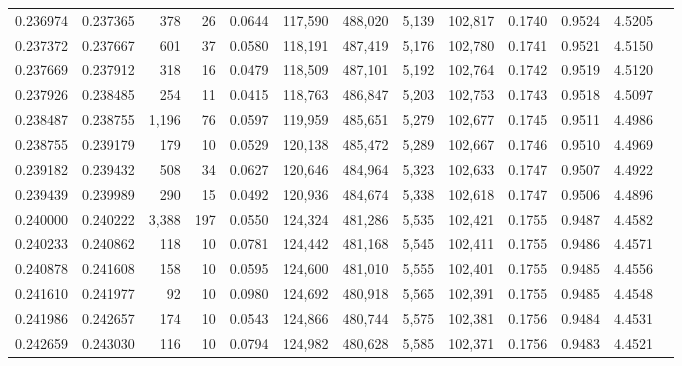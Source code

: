 \begin{tabular}{rrrrrrrrrrrrr}
0.236974 & 0.237365 &   378 &  26 &                                     0.0644 & 117,590 & 488,020 &   5,139 & 102,817 & 0.1740 & 0.9524 & 4.5205 \\
0.237372 & 0.237667 &   601 &  37 &                                     0.0580 & 118,191 & 487,419 &   5,176 & 102,780 & 0.1741 & 0.9521 & 4.5150 \\
0.237669 & 0.237912 &   318 &  16 &                                     0.0479 & 118,509 & 487,101 &   5,192 & 102,764 & 0.1742 & 0.9519 & 4.5120 \\
0.237926 & 0.238485 &   254 &  11 &                                     0.0415 & 118,763 & 486,847 &   5,203 & 102,753 & 0.1743 & 0.9518 & 4.5097 \\
0.238487 & 0.238755 & 1,196 &  76 &                                     0.0597 & 119,959 & 485,651 &   5,279 & 102,677 & 0.1745 & 0.9511 & 4.4986 \\
0.238755 & 0.239179 &   179 &  10 &                                     0.0529 & 120,138 & 485,472 &   5,289 & 102,667 & 0.1746 & 0.9510 & 4.4969 \\
0.239182 & 0.239432 &   508 &  34 &                                     0.0627 & 120,646 & 484,964 &   5,323 & 102,633 & 0.1747 & 0.9507 & 4.4922 \\
0.239439 & 0.239989 &   290 &  15 &                                     0.0492 & 120,936 & 484,674 &   5,338 & 102,618 & 0.1747 & 0.9506 & 4.4896 \\
0.240000 & 0.240222 & 3,388 & 197 &                                     0.0550 & 124,324 & 481,286 &   5,535 & 102,421 & 0.1755 & 0.9487 & 4.4582 \\
0.240233 & 0.240862 &   118 &  10 &                                     0.0781 & 124,442 & 481,168 &   5,545 & 102,411 & 0.1755 & 0.9486 & 4.4571 \\
0.240878 & 0.241608 &   158 &  10 &                                     0.0595 & 124,600 & 481,010 &   5,555 & 102,401 & 0.1755 & 0.9485 & 4.4556 \\
0.241610 & 0.241977 &    92 &  10 &                                     0.0980 & 124,692 & 480,918 &   5,565 & 102,391 & 0.1755 & 0.9485 & 4.4548 \\
0.241986 & 0.242657 &   174 &  10 &                                     0.0543 & 124,866 & 480,744 &   5,575 & 102,381 & 0.1756 & 0.9484 & 4.4531 \\
0.242659 & 0.243030 &   116 &  10 &                                     0.0794 & 124,982 & 480,628 &   5,585 & 102,371 & 0.1756 & 0.9483 & 4.4521 \\

\end{tabular}
